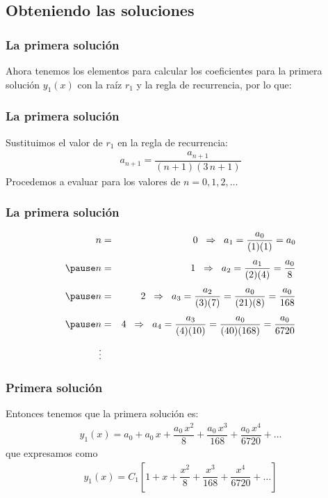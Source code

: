 \subsection{Obteniendo las soluciones}
\begin{frame}
\frametitle{La primera solución}
Ahora tenemos los elementos para calcular los coeficientes para la primera solución $y_{1}(x)$ con la raíz $r_{1}$ y la regla de recurrencia, por lo que:
\end{frame}
\begin{frame}
\frametitle{La primera solución}
Sustituimos el valor de $r_{1}$ en la regla de recurrencia:
\begin{align*}
a_{n+1} = \dfrac{a_{n+1}}{(n+1)(3 \, n +1)}
\end{align*}
\pause
Procedemos a evaluar para los valores de $n = 0, 1, 2, \ldots$
\end{frame}
\begin{frame}
\frametitle{La primera solución}
\begin{eqnarray*}
n &=& 0 \hspace{0.2cm} \Rightarrow \hspace{0.2cm} a_{1} = \dfrac{a_{0}}{(1)(1)} = a_{0} \\[0.45em] \pause
n &=& 1 \hspace{0.2cm} \Rightarrow \hspace{0.2cm} a_{2} = \dfrac{a_{1}}{(2)(4)} = \dfrac{a_{0}}{8} \\[0.45em] \pause
n &=& 2 \hspace{0.2cm} \Rightarrow \hspace{0.2cm} a_{3} = \dfrac{a_{2}}{(3)(7)} = \dfrac{a_{0}}{(21)(8)} = \dfrac{a_{0}}{168} \\[0.45em] \pause
n &=& 4 \hspace{0.2cm} \Rightarrow \hspace{0.2cm} a_{4} = \dfrac{a_{3}}{(4)(10)} = \dfrac{a_{0}}{(40)(168)} = \dfrac{a_{0}}{6720} \\[0.45em]
\vdots
\end{eqnarray*}
\end{frame}
\begin{frame}
\frametitle{Primera solución}
Entonces tenemos que la primera solución es:
\begin{align*}
y_{1} (x) = a_{0} + a_{0} \, x + \dfrac{a_{0} \, x^{2}}{8} + \dfrac{a_{0} \, x^{3}}{168} + \dfrac{a_{0} \, x^{4}}{6720} + \ldots 
\end{align*}
\pause
que expresamos como
\begin{align*}
y_{1}(x) = C_{1} \left[ 1 + x + \dfrac{x^{2}}{8} + \dfrac{x^{3}}{168} + \dfrac{x^{4}}{6720} + \ldots \right]
\end{align*}
\end{frame}
